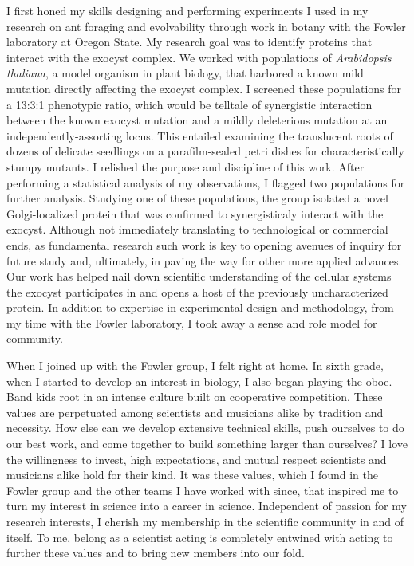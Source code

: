I first honed my skills designing and performing experiments I used in my research on ant foraging and evolvability through work in botany with the Fowler laboratory at Oregon State.
My research goal was to identify proteins that interact with the exocyst complex.
We worked with populations of \textit{Arabidopsis thaliana}, a model organism in plant biology, that harbored a known mild mutation directly affecting the exocyst complex.
I screened these populations for a 13:3:1 phenotypic ratio, which would be telltale of synergistic interaction between the known exocyst mutation and a mildly deleterious mutation at an independently-assorting locus.
This entailed examining the translucent roots of dozens of delicate seedlings on a parafilm-sealed petri dishes for characteristically stumpy mutants.
I relished the purpose and discipline of this work.
After performing a statistical analysis of my observations, I flagged two populations for further analysis.
Studying one of these populations, the group isolated a novel Golgi-localized protein that was confirmed to synergisticaly interact with the exocyst.
Although not immediately translating to technological or commercial ends, as fundamental research such work is key to opening avenues of inquiry for future study and, ultimately, in paving the way for other more applied advances.
Our work has helped nail down scientific understanding of the cellular systems the exocyst participates in and opens a host of the previously uncharacterized protein.
In addition to expertise in experimental design and methodology, from my time with the Fowler laboratory, I took away a sense and role model for community.

When I joined up with the Fowler group, I felt right at home.
In sixth grade, when I started to develop an interest in biology, I also began playing the oboe.
Band kids root in an intense culture built on cooperative competition,
These values are perpetuated among scientists and musicians alike by tradition and necessity.
How else can we develop extensive technical skills, push ourselves to do our best work, and come together to build something larger than ourselves?
I love the willingness to invest, high expectations, and mutual respect scientists and musicians alike hold for their kind.
It was these values, which I found in the Fowler group and the other teams I have worked with since, that inspired me to turn my interest in science into a career in science.
Independent of passion for my research interests, I cherish my membership in the scientific community in and of itself.
To me, belong as a scientist acting is completely entwined with acting to further these values and to bring new members into our fold.

